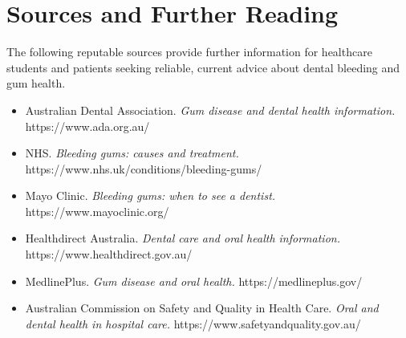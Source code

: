 \section*{Sources and Further Reading}
The following reputable sources provide further information for healthcare students and patients seeking reliable, current advice about dental bleeding and gum health.

\begin{itemize}
    \item Australian Dental Association. \textit{Gum disease and dental health information.} https://www.ada.org.au/
    \item NHS. \textit{Bleeding gums: causes and treatment.} https://www.nhs.uk/conditions/bleeding-gums/
    \item Mayo Clinic. \textit{Bleeding gums: when to see a dentist.} https://www.mayoclinic.org/
    \item Healthdirect Australia. \textit{Dental care and oral health information.} https://www.healthdirect.gov.au/
    \item MedlinePlus. \textit{Gum disease and oral health.} https://medlineplus.gov/
    \item Australian Commission on Safety and Quality in Health Care. \textit{Oral and dental health in hospital care.} https://www.safetyandquality.gov.au/
\end{itemize}
